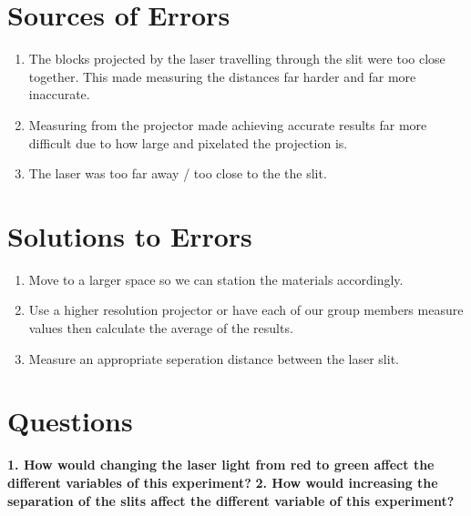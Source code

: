 \documentclass{article}
\begin{document}
\section*{Sources of Errors} {
    \begin{enumerate}
        \item {The blocks projected by the laser travelling through the slit were too close together. This made measuring the distances far harder and far more inaccurate.}
        \item {Measuring from the projector made achieving accurate results far more difficult due to how large and pixelated the projection is.}
        \item {The laser was too far away / too close to the the slit.}
    \end{enumerate}
}
\section*{Solutions to Errors} {
    \begin{enumerate}
        \item {Move to a larger space so we can station the materials accordingly.}
        \item {Use a higher resolution projector or have each of our group members measure values then calculate the average of the results.}
        \item {Measure an appropriate seperation distance between the laser slit.}
    \end{enumerate}\leavevmode
}
\section*{Questions} {
    \textbf{1. How would changing the laser light from red to green affect the different variables of this experiment?}
    \textbf{2. How would increasing the separation of the slits affect the different variable of this experiment?}
}
\end{document}
